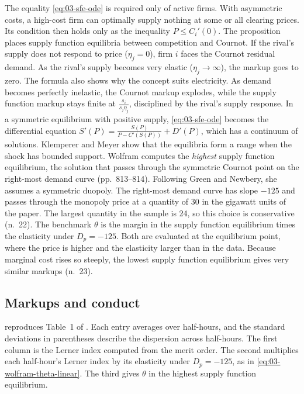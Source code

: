 The equality \eqref{eq:03-sfe-ode} is required only of active firms. With asymmetric costs, a high-cost firm can optimally supply nothing
at some or all clearing prices. Its condition then holds only as the inequality $P \le C_i'(0)$.
The proposition places supply function equilibria between competition and Cournot. If the rival's supply does not
respond to price ($\eta_j = 0$), firm $i$ faces the Cournot residual demand. As the rival's supply becomes very elastic
($\eta_j \to \infty$), the markup goes to zero. The formula also shows why the concept suits electricity. As demand
becomes perfectly inelastic, the Cournot markup explodes, while the supply function markup stays finite at
$\frac{s_i}{s_j\eta_j}$, disciplined by the rival's supply response. In a symmetric equilibrium with positive supply,
\eqref{eq:03-sfe-ode} becomes
the differential equation $S'(P) = \frac{S(P)}{P - C'(S(P))} + D'(P)$, which has a continuum of solutions. Klemperer and
Meyer show that the equilibria form a range when the shock has bounded support. Wolfram computes the \emph{highest}
supply function equilibrium, the solution that passes through the symmetric Cournot point on the right-most demand
curve (pp.~813--814). Following Green and Newbery, she assumes a symmetric duopoly. The right-most demand curve has slope
$-125$ and passes through the monopoly price at a quantity of 30 in the gigawatt units of the paper. The largest
quantity in the sample is 24, so this choice is conservative (n.~22). The benchmark $\theta$ is the margin in the supply function equilibrium
times the elasticity under $D_p = -125$. Both are evaluated at the equilibrium point, where the price is higher and the
elasticity larger than in the data. Because marginal cost rises
so steeply, the lowest supply function equilibrium gives very similar markups (n.~23).

\subsection{Markups and conduct}\label{sec:03-wolfram-results}

 reproduces Table~1 of \citet{Wolfram1999}. Each entry averages over half-hours, and the
standard deviations in parentheses describe the dispersion across half-hours. The first column is the Lerner index
computed from the merit order. The second multiplies each half-hour's Lerner index by its elasticity under $D_p = -125$,
as in \eqref{eq:03-wolfram-theta-linear}. The third gives $\theta$ in the highest supply function equilibrium.

